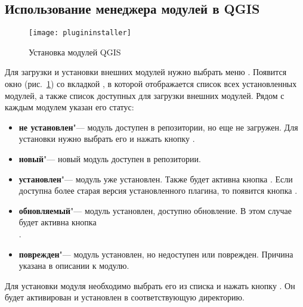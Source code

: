 \subsection{Использование менеджера модулей в QGIS}\label{sec:python_plugin_installer}

\begin{figure}[ht]
   \centering
   \texttt{[image: plugininstaller]}
   \caption{Установка модулей QGIS \nixcaption}\label{fig:plugininstaller}\smallskip
\end{figure}

Для загрузки и установки внешних модулей нужно выбрать меню
 \arrow {}.
Появится окно 
(рис.~\ref{fig:plugininstaller}) со вкладкой , в которой
отображается список всех установленных модулей, а также список доступных
для загрузки внешних модулей. Рядом с каждым модулем указан его статус:
\begin{itemize}[label=--]
\item \textbf{не установлен}"--- модуль доступен в репозитории, но еще
не загружен. Для установки нужно выбрать его и нажать кнопку
.
\item \textbf{новый}"--- новый модуль доступен в репозитории.
\item \textbf{установлен}"--- модуль уже установлен. Также будет
активна кнопка . Если доступна более
старая версия установленного плагина, то появится кнопка
.
\item \textbf{обновляемый}"--- модуль установлен, доступно обновление.
В этом случае будет активна кнопка \\
.
\item \textbf{поврежден}"--- модуль установлен, но недоступен или
поврежден. Причина указана в описании к модулю.
\end{itemize}


Для установки модуля необходимо выбрать его из списка и нажать кнопку
. Он будет активирован и установлен в
соответствующую директорию.

